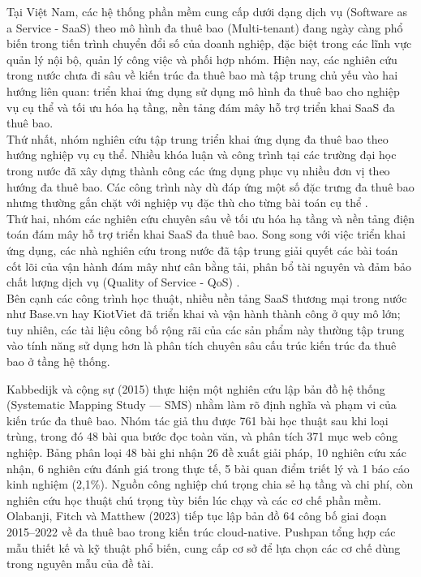 \label{chap:v4-introduction}
\label{v4-intro-1}

\label{v4-intro-1-1}

Tại Việt Nam, các hệ thống phần mềm cung cấp dưới dạng dịch vụ (Software as a Service - SaaS) theo mô hình đa thuê bao (Multi-tenant) đang ngày càng phổ biến trong tiến trình chuyển đổi số của doanh nghiệp, đặc biệt trong các lĩnh vực quản lý nội bộ, quản lý công việc và phối hợp nhóm. Hiện nay, các nghiên cứu trong nước chưa đi sâu về kiến trúc đa thuê bao mà tập trung chủ yếu vào hai hướng liên quan: triển khai ứng dụng sử dụng mô hình đa thuê bao cho nghiệp vụ cụ thể và tối ưu hóa hạ tầng, nền tảng đám mây hỗ trợ triển khai SaaS đa thuê bao.\\
Thứ nhất, nhóm nghiên cứu tập trung triển khai ứng dụng đa thuê bao theo hướng nghiệp vụ cụ thể. Nhiều khóa luận và công trình tại các trường đại học trong nước đã xây dựng thành công các ứng dụng phục vụ nhiều đơn vị theo hướng đa thuê bao. Các công trình này dù đáp ứng một số đặc trưng đa thuê bao nhưng thường gắn chặt với nghiệp vụ đặc thù cho từng bài toán cụ thể \cite{v4-01}\cite{v4-02}.\\
Thứ hai, nhóm các nghiên cứu chuyên sâu về tối ưu hóa hạ tầng và nền tảng điện toán đám mây hỗ trợ triển khai SaaS đa thuê bao. Song song với việc triển khai ứng dụng, các nhà nghiên cứu trong nước đã tập trung giải quyết các bài toán cốt lõi của vận hành đám mây như cân bằng tải, phân bổ tài nguyên và đảm bảo chất lượng dịch vụ (Quality of Service - QoS) \cite{v4-03}\cite{v4-04}.\\
Bên cạnh các công trình học thuật, nhiều nền tảng SaaS thương mại trong nước như Base.vn hay KiotViet đã triển khai và vận hành thành công ở quy mô lớn; tuy nhiên, các tài liệu công bố rộng rãi của các sản phẩm này thường tập trung vào tính năng sử dụng hơn là phân tích chuyên sâu cấu trúc kiến trúc đa thuê bao ở tầng hệ thống.

\label{v4-intro-1-2}

Kabbedijk và cộng sự (2015) \cite{v4-05} thực hiện một nghiên cứu lập bản đồ hệ thống (Systematic Mapping Study --- SMS) nhằm làm rõ định nghĩa và phạm vi của kiến trúc đa thuê bao. Nhóm tác giả thu được 761 bài học thuật sau khi loại trùng, trong đó 48 bài qua bước đọc toàn văn, và phân tích 371 mục web công nghiệp. Bảng phân loại 48 bài ghi nhận 26 đề xuất giải pháp, 10 nghiên cứu xác nhận, 6 nghiên cứu đánh giá trong thực tế, 5 bài quan điểm triết lý và 1 báo cáo kinh nghiệm (2,1\%). Nguồn công nghiệp chú trọng chia sẻ hạ tầng và chi phí, còn nghiên cứu học thuật chú trọng tùy biến lúc chạy và các cơ chế phần mềm. Olabanji, Fitch và Matthew (2023) \cite{v4-06} tiếp tục lập bản đồ 64 công bố giai đoạn 2015--2022 về đa thuê bao trong kiến trúc cloud-native. Pushpan \cite{v4-07} tổng hợp các mẫu thiết kế và kỹ thuật phổ biến, cung cấp cơ sở để lựa chọn các cơ chế dùng trong nguyên mẫu của đề tài.

